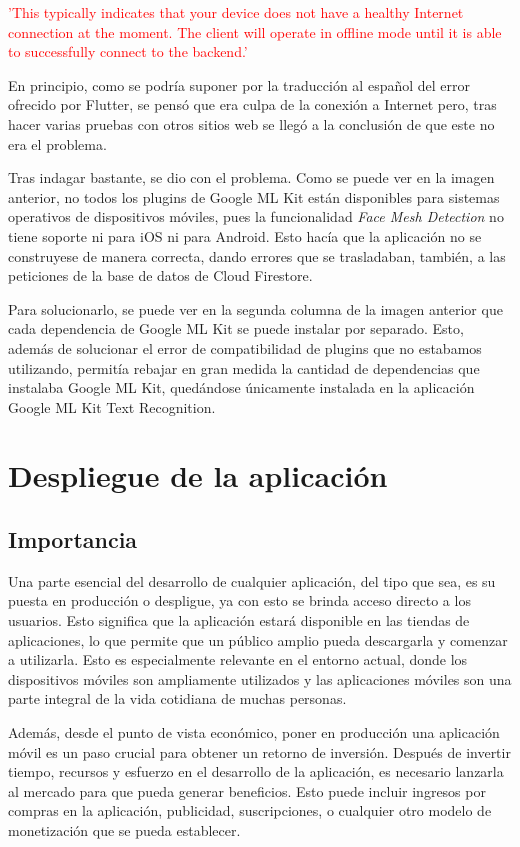 \documentclass{article}
\begin{document}
\textcolor{red}{'This typically indicates that your device does not have a healthy Internet connection at the moment. The client will operate in offline mode until it is able to successfully connect to the backend.'}

\newpage

En principio, como se podría suponer por la traducción al español del error ofrecido por Flutter, se pensó que era culpa de la conexión a Internet pero, tras hacer varias pruebas con otros sitios web se llegó a la conclusión de que este no era el problema.

Tras indagar bastante, se dio con el problema. Como se puede ver en la imagen anterior, no todos los plugins de Google ML Kit están disponibles para sistemas operativos de dispositivos móviles, pues la funcionalidad \textit{Face Mesh Detection} no tiene soporte ni para iOS ni para Android. Esto hacía que la aplicación no se construyese de manera correcta, dando errores que se trasladaban, también, a las peticiones de la base de datos de Cloud Firestore.

Para solucionarlo, se puede ver en la segunda columna de la imagen anterior que cada dependencia de Google ML Kit se puede instalar por separado. Esto, además de solucionar el error de compatibilidad de plugins que no estabamos utilizando, permitía rebajar en gran medida la cantidad de dependencias que instalaba Google ML Kit, quedándose únicamente instalada en la aplicación Google ML Kit Text Recognition.

\section{Despliegue de la aplicación}

\subsection{Importancia}

Una parte esencial del desarrollo de cualquier aplicación, del tipo que sea, es su puesta en producción o despligue, ya con esto se brinda acceso directo a los usuarios. Esto significa que la aplicación estará disponible en las tiendas de aplicaciones, lo que permite que un público amplio pueda descargarla y comenzar a utilizarla. Esto es especialmente relevante en el entorno actual, donde los dispositivos móviles son ampliamente utilizados y las aplicaciones móviles son una parte integral de la vida cotidiana de muchas personas.

Además, desde el punto de vista económico, poner en producción una aplicación móvil es un paso crucial para obtener un retorno de inversión. Después de invertir tiempo, recursos y esfuerzo en el desarrollo de la aplicación, es necesario lanzarla al mercado para que pueda generar beneficios. Esto puede incluir ingresos por compras en la aplicación, publicidad, suscripciones, o cualquier otro modelo de monetización que se pueda establecer.
\end{document}

